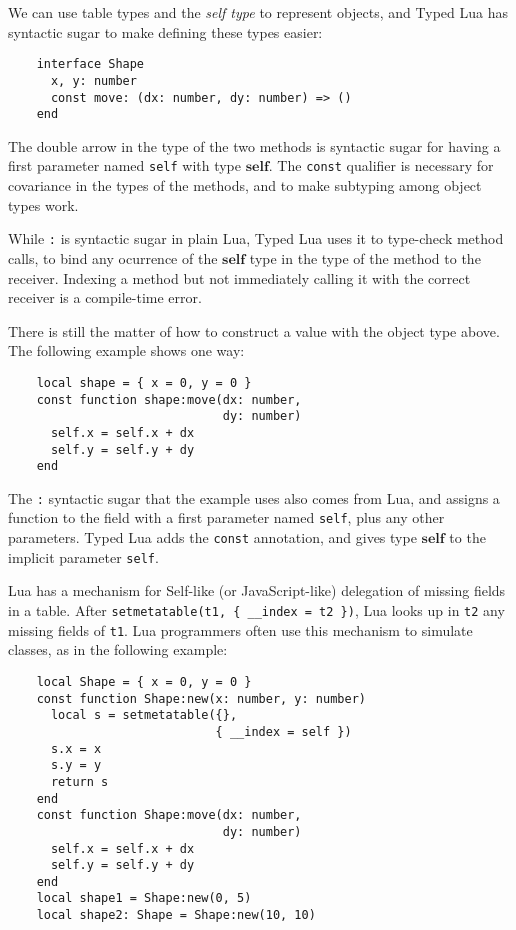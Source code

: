\documentclass{sig-alternate}
\newcommand{\Self}{\mathbf{self}}
\begin{document}
We can use table types and the {\em self type}
to represent objects,
and Typed Lua has syntactic sugar to make defining these
types easier:

\begin{verbatim}
    interface Shape
      x, y: number
      const move: (dx: number, dy: number) => ()
    end
\end{verbatim}

The double arrow in the type of the two methods is
syntactic sugar for having a first parameter named
{\tt self} with type $\Self$. The
{\tt const} qualifier is necessary for covariance
in the types of the methods, and to make subtyping
among object types work.

While {\tt :} is syntactic sugar in plain Lua, Typed Lua
uses it to type-check method calls, to bind any ocurrence
of the $\Self$ type in the type of the method to the
receiver. Indexing a method but not immediately calling
it with the correct receiver is a compile-time error.

There is still the matter of how to construct a value with
the object type above. The following example shows one
way:

\begin{verbatim}
    local shape = { x = 0, y = 0 }
    const function shape:move(dx: number, 
                              dy: number)
      self.x = self.x + dx
      self.y = self.y + dy
    end
\end{verbatim}

The {\tt :} syntactic sugar that the example uses also comes
from Lua, and assigns a function to the field with a first
parameter named {\tt self}, plus any other parameters. Typed
Lua adds the {\tt const} annotation, and gives type $\Self$
to the implicit parameter {\tt self}. 

Lua has a mechanism for Self-like (or JavaScript-like)
 delegation of missing
fields in a table. After {\tt setmetatable(t1,
\{ \_\_index = t2 \})}, Lua looks up in {\tt t2} any missing
fields of {\tt t1}. Lua programmers often use this mechanism
to simulate classes, as in the following example:

\begin{verbatim}
    local Shape = { x = 0, y = 0 }
    const function Shape:new(x: number, y: number)
      local s = setmetatable({},
                             { __index = self })
      s.x = x
      s.y = y
      return s
    end
    const function Shape:move(dx: number,
                              dy: number)
      self.x = self.x + dx
      self.y = self.y + dy
    end
    local shape1 = Shape:new(0, 5)
    local shape2: Shape = Shape:new(10, 10)
\end{verbatim} 
\end{document}

